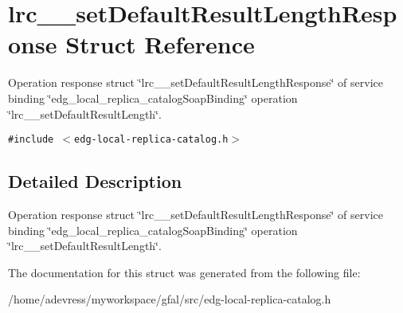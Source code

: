 \section{lrc\_\-\_\-set\-Default\-Result\-Length\-Response Struct Reference}
\label{structlrc____setDefaultResultLengthResponse}
Operation response struct \char`\"{}lrc\_\-\_\-set\-Default\-Result\-Length\-Response\char`\"{} of service binding \char`\"{}edg\_\-local\_\-replica\_\-catalog\-Soap\-Binding\char`\"{} operation \char`\"{}lrc\_\-\_\-set\-Default\-Result\-Length\char`\"{}.  


{\tt \#include $<$edg-local-replica-catalog.h$>$}



\subsection{Detailed Description}
Operation response struct \char`\"{}lrc\_\-\_\-set\-Default\-Result\-Length\-Response\char`\"{} of service binding \char`\"{}edg\_\-local\_\-replica\_\-catalog\-Soap\-Binding\char`\"{} operation \char`\"{}lrc\_\-\_\-set\-Default\-Result\-Length\char`\"{}. 



The documentation for this struct was generated from the following file:\begin{CompactItemize}
\item 
/home/adevress/myworkspace/gfal/src/edg-local-replica-catalog.h\end{CompactItemize}
